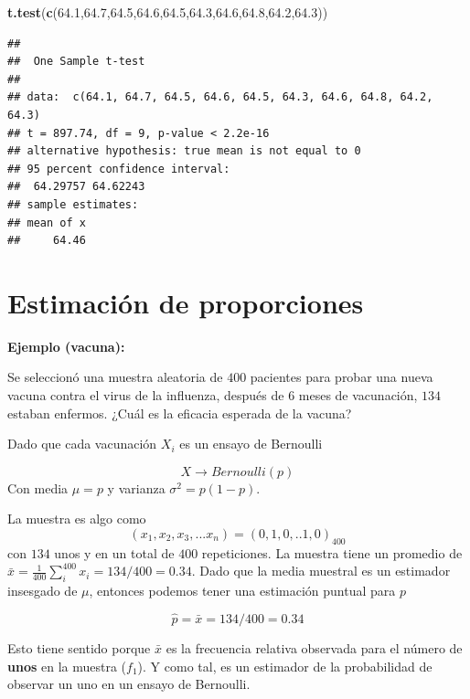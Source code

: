 \documentclass[
]{book}
\newenvironment{Shaded}{\begin{snugshade}}{\end{snugshade}}
\newcommand{\FloatTok}[1]{\textcolor[rgb]{0.00,0.00,0.81}{#1}}
\newcommand{\FunctionTok}[1]{\textcolor[rgb]{0.13,0.29,0.53}{\textbf{#1}}}
\newcommand{\NormalTok}[1]{#1}
\begin{document}
\begin{Shaded}
\begin{Highlighting}[]
\FunctionTok{t.test}\NormalTok{(}\FunctionTok{c}\NormalTok{(}\FloatTok{64.1}\NormalTok{,}\FloatTok{64.7}\NormalTok{,}\FloatTok{64.5}\NormalTok{,}\FloatTok{64.6}\NormalTok{,}\FloatTok{64.5}\NormalTok{,}\FloatTok{64.3}\NormalTok{,}\FloatTok{64.6}\NormalTok{,}\FloatTok{64.8}\NormalTok{,}\FloatTok{64.2}\NormalTok{,}\FloatTok{64.3}\NormalTok{))}
\end{Highlighting}
\end{Shaded}

\begin{verbatim}
## 
##  One Sample t-test
## 
## data:  c(64.1, 64.7, 64.5, 64.6, 64.5, 64.3, 64.6, 64.8, 64.2, 64.3)
## t = 897.74, df = 9, p-value < 2.2e-16
## alternative hypothesis: true mean is not equal to 0
## 95 percent confidence interval:
##  64.29757 64.62243
## sample estimates:
## mean of x 
##     64.46
\end{verbatim}

\hypertarget{estimaciuxf3n-de-proporciones}{%
\section{Estimación de proporciones}\label{estimaciuxf3n-de-proporciones}}

\textbf{Ejemplo (vacuna):}

Se seleccionó una muestra aleatoria de \(400\) pacientes para probar una nueva vacuna contra el virus de la influenza, después de \(6\) meses de vacunación, \(134\) estaban enfermos. ¿Cuál es la eficacia esperada de la vacuna?

Dado que cada vacunación \(X_i\) es un ensayo de Bernoulli

\[X \rightarrow Bernoulli(p)\]
Con media \(\mu=p\) y varianza \(\sigma^2=p(1-p)\).

La muestra es algo como
\[(x_1,x_2, x_3, ...x_n)=(0,1,0,.. 1, 0)_{400}\] con \(134\) unos y en un total de \(400\) repeticiones. La muestra tiene un promedio de \(\bar{x}=\frac{1}{400}\sum_i^{400} x_i=134/400=0.34\). Dado que la media muestral es un estimador insesgado de \(\mu\), entonces podemos tener una estimación puntual para \(p\)

\[\hat{p}=\bar{x}=134/400=0.34\]

Esto tiene sentido porque \(\bar{x}\) es la frecuencia relativa observada para el número de \textbf{unos} en la muestra (\(f_1\)). Y como tal, es un estimador de la probabilidad de observar un uno en un ensayo de Bernoulli.
\end{document}
